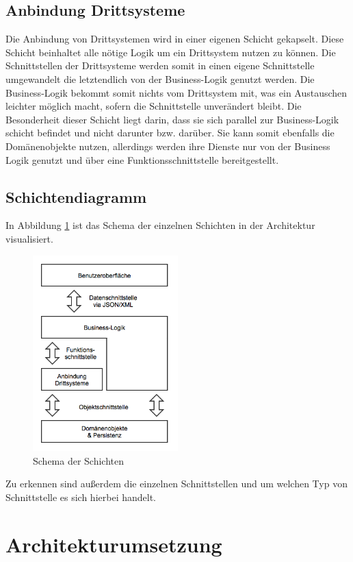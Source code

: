 \documentclass[a4paper,12pt]{article} %
\begin{document}
\subsection{Anbindung Drittsysteme}
Die Anbindung von Drittsystemen wird in einer eigenen Schicht gekapselt. Diese Schicht beinhaltet alle nötige Logik um ein Drittsystem nutzen zu können. Die Schnittstellen der Drittsysteme werden somit in einen eigene Schnittstelle umgewandelt die letztendlich von der Business-Logik genutzt werden. Die Business-Logik bekommt somit nichts vom Drittsystem mit, was ein Austauschen leichter möglich macht, sofern die Schnittstelle unverändert bleibt. Die Besonderheit dieser Schicht liegt darin, dass sie sich parallel zur Business-Logik schicht befindet und nicht darunter bzw. darüber. Sie kann somit ebenfalls die Domänenobjekte nutzen, allerdings werden ihre Dienste nur von der Business Logik genutzt und über eine Funktionsschnittstelle bereitgestellt.

\subsection{Schichtendiagramm}
In Abbildung \ref{fig:architektur} ist das Schema der einzelnen Schichten in der Architektur visualisiert.
\begin{figure}[H]
	\centering
	\includegraphics[width=0.5\textwidth]{img/architektur.png}
	\caption{Schema der Schichten}
	\label{fig:architektur}
\end{figure}
Zu erkennen sind außerdem die einzelnen Schnittstellen und um welchen Typ von Schnittstelle es sich hierbei handelt.

\section{Architekturumsetzung}
\end{document}
